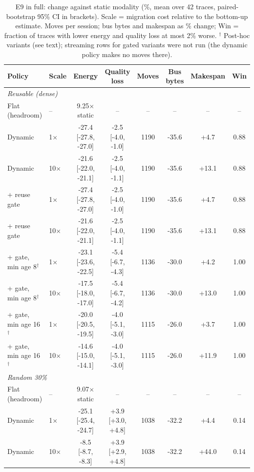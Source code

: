 \begin{table}[h]
\centering\scriptsize\setlength{\tabcolsep}{3pt}
\caption{E9 in full: change against static modality (\%, mean over 42 traces, paired-bootstrap 95\% CI in brackets). Scale = migration cost relative to the bottom-up estimate. Moves per session; bus bytes and makespan as \% change; Win = fraction of traces with lower energy and quality loss at most 2\% worse. $^\dagger$ Post-hoc variants (see text); streaming rows for gated variants were not run (the dynamic policy makes no moves there).}
\label{tab:e9full}
\begin{tabular}{llcccccc}
\toprule
Policy & Scale & Energy & Quality loss & Moves & Bus bytes & Makespan & Win\\
\midrule
\multicolumn{8}{l}{\textit{Reusable (dense)}}\\
\quad Flat (headroom) & -- & 9.25$\times$ static & -- & -- & -- & -- & --\\
\quad Dynamic & 1$\times$ & -27.4 [-27.8, -27.0] & -2.5 [-4.0, -1.0] & 1190 & -35.6 & +4.7 & 0.88\\
\quad Dynamic & 10$\times$ & -21.6 [-22.0, -21.1] & -2.5 [-4.0, -1.1] & 1190 & -35.6 & +13.1 & 0.88\\
\quad + reuse gate & 1$\times$ & -27.4 [-27.8, -27.0] & -2.5 [-4.0, -1.0] & 1190 & -35.6 & +4.7 & 0.88\\
\quad + reuse gate & 10$\times$ & -21.6 [-22.0, -21.1] & -2.5 [-4.0, -1.1] & 1190 & -35.6 & +13.1 & 0.88\\
\quad + gate, min age 8$^\dagger$ & 1$\times$ & -23.1 [-23.6, -22.5] & -5.4 [-6.7, -4.3] & 1136 & -30.0 & +4.2 & 1.00\\
\quad + gate, min age 8$^\dagger$ & 10$\times$ & -17.5 [-18.0, -17.0] & -5.4 [-6.7, -4.2] & 1136 & -30.0 & +13.0 & 1.00\\
\quad + gate, min age 16$^\dagger$ & 1$\times$ & -20.0 [-20.5, -19.5] & -4.0 [-5.1, -3.0] & 1115 & -26.0 & +3.7 & 1.00\\
\quad + gate, min age 16$^\dagger$ & 10$\times$ & -14.6 [-15.0, -14.1] & -4.0 [-5.1, -3.0] & 1115 & -26.0 & +11.9 & 1.00\\
\midrule
\multicolumn{8}{l}{\textit{Random 30\%}}\\
\quad Flat (headroom) & -- & 9.07$\times$ static & -- & -- & -- & -- & --\\
\quad Dynamic & 1$\times$ & -25.1 [-25.4, -24.7] & +3.9 [+3.0, +4.8] & 1038 & -32.2 & +4.4 & 0.14\\
\quad Dynamic & 10$\times$ & -8.5 [-8.7, -8.3] & +3.9 [+2.9, +4.8] & 1038 & -32.2 & +44.0 & 0.14\\

\end{tabular}
\end{table}
